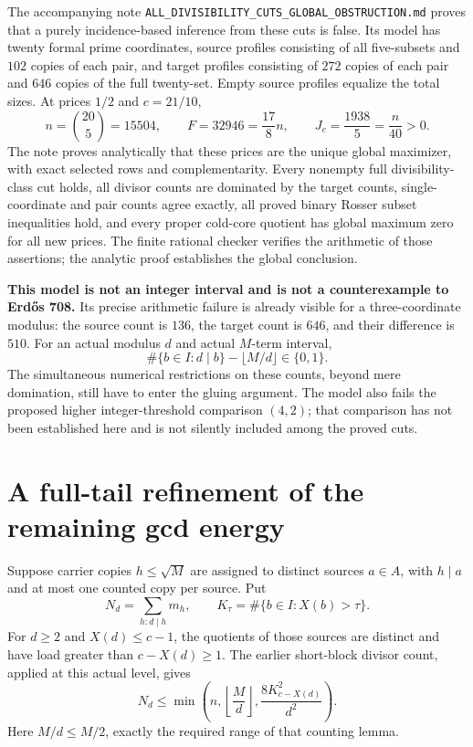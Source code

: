 \documentclass[a4paper,11pt]{article}
\begin{document}
The accompanying note \texttt{ALL\_DIVISIBILITY\_CUTS\_GLOBAL\_OBSTRUCTION.md} proves that a purely incidence-based inference from these cuts is false. Its model has twenty formal prime coordinates, source profiles consisting of all five-subsets and $102$ copies of each pair, and target profiles consisting of $272$ copies of each pair and $646$ copies of the full twenty-set. Empty source profiles equalize the total sizes. At prices $1/2$ and $c=21/10$,
\[
 n=\binom{20}{5}=15504,\qquad
 F=32946=\frac{17}{8}n,\qquad
 J_c=\frac{1938}{5}=\frac n{40}>0.
\]
The note proves analytically that these prices are the unique global maximizer, with exact selected rows and complementarity. Every nonempty full divisibility-class cut holds, all divisor counts are dominated by the target counts, single-coordinate and pair counts agree exactly, all proved binary Rosser subset inequalities hold, and every proper cold-core quotient has global maximum zero for all new prices. The finite rational checker verifies the arithmetic of those assertions; the analytic proof establishes the global conclusion.

\textbf{This model is not an integer interval and is not a counterexample to Erd\H{o}s 708.} Its precise arithmetic failure is already visible for a three-coordinate modulus: the source count is $136$, the target count is $646$, and their difference is $510$. For an actual modulus $d$ and actual $M$-term interval,
\[
 \#\{b\in I:d\mid b\}-\lfloor M/d\rfloor\in\{0,1\}.
\]
The simultaneous numerical restrictions on these counts, beyond mere domination, still have to enter the gluing argument. The model also fails the proposed higher integer-threshold comparison $(4,2)$; that comparison has not been established here and is not silently included among the proved cuts.

\section{A full-tail refinement of the remaining gcd energy}
Suppose carrier copies $h\le\sqrt M$ are assigned to distinct sources $a\in A$, with $h\mid a$ and at most one counted copy per source. Put
\[
 N_d=\sum_{h:d\mid h}m_h,\qquad
 K_\tau=\#\{b\in I:X(b)>\tau\}.
\]
For $d\ge2$ and $X(d)\le c-1$, the quotients of those sources are distinct and have load greater than $c-X(d)\ge1$. The earlier short-block divisor count, applied at this actual level, gives
\begin{equation}\label{eq:Nd}
 \boxed{N_d\le\min\left(n,\left\lfloor\frac Md\right\rfloor,
 \frac{8K_{c-X(d)}^2}{d^2}\right).}
\end{equation}
Here $M/d\le M/2$, exactly the required range of that counting lemma.
\end{document}
